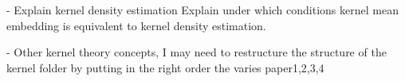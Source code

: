 - Explain kernel density estimation
Explain under which conditions kernel mean embedding
is equivalent to kernel density estimation.

- Other kernel theory concepts, I may need to
restructure the structure of the kernel folder
by putting in the right order the varies paper1,2,3,4

